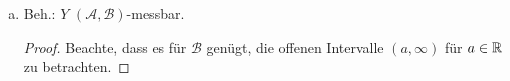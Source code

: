 \documentclass[uebung]{lecture}
\begin{document}
\begin{aufgabe}
\begin{enumerate}[(a)]
\begin{enumerate}[(1)]
\begin{proof}
                    Definiere nun $h_m \coloneqq \inf_{n \ge m} X_n$. $h_m$ messbar nach (1) (ii)
                    $\forall m \in \N$. Dann ist auch
                    \[
                        \liminf_{n \to \infty} X_n = \sup_{m \ge 1} \inf_{n \ge m} X_n = \sup_{m \ge 1} h_m
                    \] $(\mathscr{A}, \overline{\mathscr{B}})$-messbar nach (1)(i).
                    \end{proof}
                \item Beh.: $\lim_{n \to \infty} X_n$ $(\mathscr{A}, \overline{\mathscr{B}})$-messbar.
                    \begin{proof}
                        Sei $X = \lim_{n \to \infty} X_n$. Dann ist
                        $X = \liminf_{n \to \infty} X_n = \limsup_{n \to \infty} X_n$, also
                        $X$ $(\mathscr{A}, \overline{\mathscr{B}})$-messbar nach (2).
                    \end{proof}
            \end{enumerate}
        \item Beh.: $Y$ $(\mathscr{A}, \mathscr{B})$-messbar.
            \begin{proof}
                Beachte, dass es für $\mathscr{B}$ genügt, die offenen Intervalle
                $(a, \infty)$ für $a \in \mathbb{R}$ zu betrachten.


\end{proof}
\end{enumerate}
\end{aufgabe}
\end{document}
